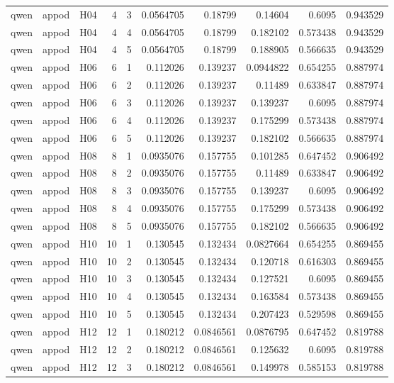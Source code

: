 \begin{longtable}{lllrrrrrrr}
qwen & appod & H04 & 4 & 3 & 0.0564705 & 0.18799 & 0.14604 & 0.6095 & 0.943529 \\
qwen & appod & H04 & 4 & 4 & 0.0564705 & 0.18799 & 0.182102 & 0.573438 & 0.943529 \\
qwen & appod & H04 & 4 & 5 & 0.0564705 & 0.18799 & 0.188905 & 0.566635 & 0.943529 \\
qwen & appod & H06 & 6 & 1 & 0.112026 & 0.139237 & 0.0944822 & 0.654255 & 0.887974 \\
qwen & appod & H06 & 6 & 2 & 0.112026 & 0.139237 & 0.11489 & 0.633847 & 0.887974 \\
qwen & appod & H06 & 6 & 3 & 0.112026 & 0.139237 & 0.139237 & 0.6095 & 0.887974 \\
qwen & appod & H06 & 6 & 4 & 0.112026 & 0.139237 & 0.175299 & 0.573438 & 0.887974 \\
qwen & appod & H06 & 6 & 5 & 0.112026 & 0.139237 & 0.182102 & 0.566635 & 0.887974 \\
qwen & appod & H08 & 8 & 1 & 0.0935076 & 0.157755 & 0.101285 & 0.647452 & 0.906492 \\
qwen & appod & H08 & 8 & 2 & 0.0935076 & 0.157755 & 0.11489 & 0.633847 & 0.906492 \\
qwen & appod & H08 & 8 & 3 & 0.0935076 & 0.157755 & 0.139237 & 0.6095 & 0.906492 \\
qwen & appod & H08 & 8 & 4 & 0.0935076 & 0.157755 & 0.175299 & 0.573438 & 0.906492 \\
qwen & appod & H08 & 8 & 5 & 0.0935076 & 0.157755 & 0.182102 & 0.566635 & 0.906492 \\
qwen & appod & H10 & 10 & 1 & 0.130545 & 0.132434 & 0.0827664 & 0.654255 & 0.869455 \\
qwen & appod & H10 & 10 & 2 & 0.130545 & 0.132434 & 0.120718 & 0.616303 & 0.869455 \\
qwen & appod & H10 & 10 & 3 & 0.130545 & 0.132434 & 0.127521 & 0.6095 & 0.869455 \\
qwen & appod & H10 & 10 & 4 & 0.130545 & 0.132434 & 0.163584 & 0.573438 & 0.869455 \\
qwen & appod & H10 & 10 & 5 & 0.130545 & 0.132434 & 0.207423 & 0.529598 & 0.869455 \\
qwen & appod & H12 & 12 & 1 & 0.180212 & 0.0846561 & 0.0876795 & 0.647452 & 0.819788 \\
qwen & appod & H12 & 12 & 2 & 0.180212 & 0.0846561 & 0.125632 & 0.6095 & 0.819788 \\
qwen & appod & H12 & 12 & 3 & 0.180212 & 0.0846561 & 0.149978 & 0.585153 & 0.819788 \\

\end{longtable}
